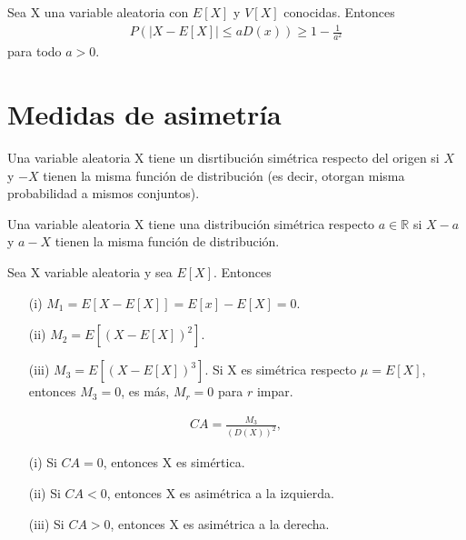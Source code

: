 \begin{teo}
Sea X una variable aleatoria con $E[X]$ y $V[X]$ conocidas. Entonces
\begin{align*}
    P(|X - E[X]| \leq aD(x)) \ge 1 - \frac{1}{a^2}
\end{align*}
para todo $a > 0$.
\end{teo}

\section{Medidas de asimetría}

\begin{defi}
Una variable aleatoria X tiene un disrtibución simétrica respecto del origen si $X$ y $-X$ tienen la misma función de distribución (es decir, otorgan misma probabilidad a mismos conjuntos).
\end{defi}

\begin{defi}
Una variable aleatoria X tiene una distribución simétrica respecto $a \in \mathbb{R}$ si $X - a$ y $a - X$ tienen la misma función de distribución.
\end{defi}

\begin{obs}
Sea X variable aleatoria y sea $E[X]$. Entonces
\begin{enumerate}
    \item[(i)] $M_1 = E[X - E[X]] = E[x] - E[X] = 0$.
    \item[(ii)] $M_2 = E[(X - E[X])^2]$.
    \item[(iii)] $M_3 = E[(X - E[X])^3]$. Si X es simétrica respecto $\mu = E[X]$, entonces $M_3 = 0$, es más, $M_r = 0$ para $r$ impar.
\end{enumerate}
\end{obs}

\begin{defi}
\begin{align*}
    CA = \frac{M_3}{(D(X))^2},
\end{align*}
\begin{enumerate}
    \item[(i)] Si $CA = 0$, entonces X es simértica.
    \item[(ii)] Si $CA < 0$, entonces X es asimétrica a la izquierda.
    \item[(iii)] Si $CA > 0$, entonces X es asimétrica a la derecha.
\end{enumerate}
\end{defi}

